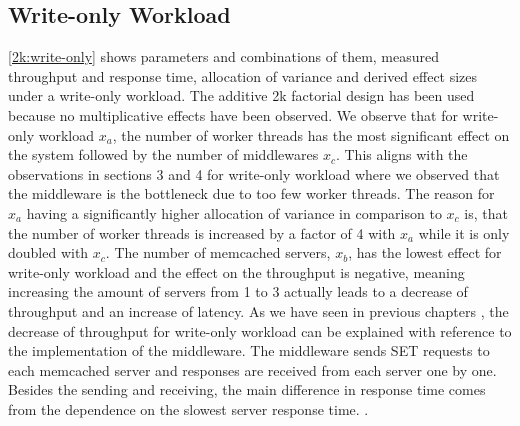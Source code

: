 \documentclass[11pt,a4paper]{article}
\begin{document}
\subsection{Write-only Workload}
\autoref{2k:write-only} shows parameters and combinations of them, measured throughput and response time, allocation of variance and derived effect sizes under a write-only workload. The additive 2k factorial design has been used because no multiplicative effects have been observed. We observe that for write-only workload $x_a$, the number of worker threads has the most significant effect on the system followed by the number of middlewares $x_c$. This aligns with the observations in sections 3 and 4 for write-only workload where we observed that the middleware is the bottleneck due to too few worker threads. The reason for $x_a$ having a significantly higher allocation of variance in comparison to $x_c$ is, that the number of worker threads is increased by a factor of 4 with $x_a$ while it is only doubled with $x_c$.
The number of memcached servers, $x_b$, has the lowest effect for write-only workload and the effect on the throughput is negative, meaning increasing the amount of servers from 1 to 3 actually leads to a decrease of throughput and an increase of latency. 
As we have seen in previous chapters , the decrease of throughput for write-only workload can be explained with reference to the implementation of the middleware. The middleware sends SET requests to each memcached server and responses are received from each server one by one. Besides the sending and receiving, the main difference in response time comes from the dependence on the slowest server response time. .
\end{document}
